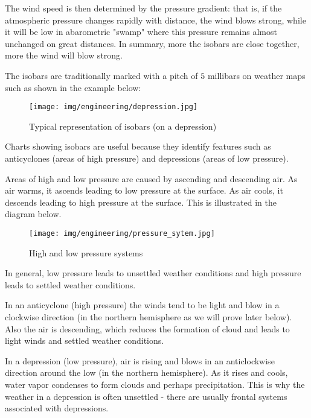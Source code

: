 	The wind speed is then determined by the pressure gradient: that is, if the atmospheric pressure changes rapidly with distance, the wind blows strong, while it will be low in abarometric  "swamp" where this pressure remains almost unchanged on great distances. In summary, more the isobars are close together, more the wind will blow strong.

	The isobars are traditionally marked with a pitch of $5$ millibars on weather maps such as shown in the example below:
	\begin{figure}[H]
		\begin{center}
			\texttt{[image: img/engineering/depression.jpg]}
		\end{center}	
		\caption{Typical representation of isobars (on a depression)}
	\end{figure}
	Charts showing isobars are useful because they identify features such as anticyclones (areas of high pressure) and depressions (areas of low pressure).

	Areas of high and low pressure are caused by ascending and descending air. As air warms, it ascends leading to low pressure at the surface. As air cools, it descends leading to high pressure at the surface. This is illustrated in the diagram below.
	\begin{figure}[H]
		\begin{center}
			\texttt{[image: img/engineering/pressure\_sytem.jpg]}
		\end{center}	
		\caption{High and low pressure systems}
	\end{figure}
	In general, low pressure leads to unsettled weather conditions and high pressure leads to settled weather conditions.

	In an anticyclone (high pressure) the winds tend to be light and blow in a clockwise direction (in the northern hemisphere as we will prove later below). Also the air is descending, which reduces the formation of cloud and leads to light winds and settled weather conditions.

	In a depression (low pressure), air is rising and blows in an anticlockwise direction around the low (in the northern hemisphere). As it rises and cools, water vapor condenses to form clouds and perhaps precipitation. This is why the weather in a depression is often unsettled - there are usually frontal systems associated with depressions.
	
